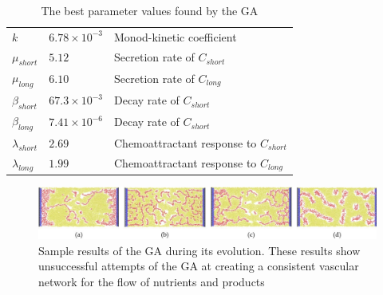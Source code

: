 \begin{table}[ht]
    \caption{The best parameter values found by the GA} %
    \centering
    \begin{footnotesize}
        \begin{tabular}{l l l}
            \hline

            $k$                & $6.78 \times 10^{-3}$ & Monod-kinetic coefficient
            \\
            $\mu_{short}$      & $5.12$                & Secretion rate of
            $C_{short}$           \\
            $\mu_{long}$       & $6.10$                & Secretion rate of $C_{long}$
            \\
            $\beta_{short} $   & $67.3 \times 10^{-3}$ & Decay rate of $C_{short}$
            \\
            $\beta_{long} $    & $7.41 \times 10^{-6}$ & Decay rate of $C_{short}$
            \\
            $\lambda_{short} $ & $2.69$                & Chemoattractant response to
            $C_{short}$ \\
            $\lambda_{long} $  & $1.99$                & Chemoattractant response to
            $C_{long}$\\
            [1ex]      %

            \hline
        \end{tabular}
    \end{footnotesize}
    \label{results}
\end{table}

\begin{figure}[ht]
    \begin{center}
        \includegraphics[width=\textwidth]{./results/bad factories.jpg}
    \end{center}
    \caption{Sample results of the GA during its evolution. These results show
    unsuccessful attempts of the GA at creating a consistent vascular network for the
    flow of nutrients and products}
    \label{badFactories}
\end{figure}

